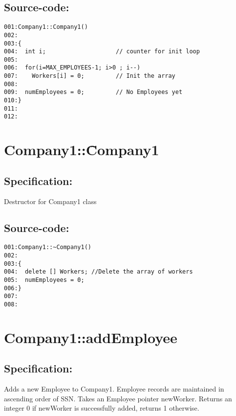 \subsection*{Source-code:}
\begin{verbatim}
001:Company1::Company1()
002:
003:{
004:  int i;                    // counter for init loop
005:    
006:  for(i=MAX_EMPLOYEES-1; i>0 ; i--)
007:    Workers[i] = 0;         // Init the array
008:
009:  numEmployees = 0;         // No Employees yet
010:}
011:
012:
\end{verbatim}
\section{Company1::\~Company1}
\subsection*{Specification:}
Destructor for Company1 class
\subsection*{Source-code:}
\begin{verbatim}
001:Company1::~Company1()
002:
003:{
004:  delete [] Workers; //Delete the array of workers
005:  numEmployees = 0;
006:}
007:
008:
\end{verbatim}
\section{Company1::addEmployee}
\subsection*{Specification:}
Adds a new Employee to Company1.
  Employee records are maintained in ascending order of SSN.
  Takes an Employee pointer newWorker.
  Returns an integer 0 if newWorker is successfully added,
  returns 1 otherwise.
